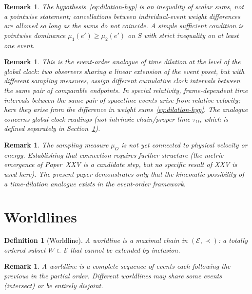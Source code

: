 \documentclass[12pt]{article}
\newtheorem{definition}[theorem]{Definition}
\newtheorem{remark}[theorem]{Remark}
\newcommand{\Ecal}{\mathcal{E}}
\begin{document}
\begin{remark}
The hypothesis~\eqref{eq:dilation-hyp} is an inequality of scalar sums, not a pointwise statement; cancellations between individual-event weight differences are allowed so long as the sums do not coincide. A simple sufficient condition is pointwise dominance $\mu_1(e') \geq \mu_2(e')$ on $S$ with strict inequality on at least one event.
\end{remark}

\begin{remark}
This is the event-order analogue of time dilation at the level of the global clock: two observers sharing a linear extension of the event poset, but with different sampling measures, assign different cumulative clock intervals between the same pair of comparable endpoints. In special relativity, frame-dependent time intervals between the same pair of spacetime events arise from relative velocity; here they arise from the difference in weight sums~\eqref{eq:dilation-hyp}. The analogue concerns global clock readings (not intrinsic chain/proper time $\tau_O$, which is defined separately in Section~\ref{sec:worldlines}).
\end{remark}

\begin{remark}
The sampling measure $\mu_O$ is not yet connected to physical velocity or energy. Establishing that connection requires further structure (the metric emergence of Paper~XXV is a candidate step, but no specific result of XXV is used here). The present paper demonstrates only that the \textit{kinematic possibility} of a time-dilation analogue exists in the event-order framework.
\end{remark}

\section{Worldlines}\label{sec:worldlines}

\begin{definition}[Worldline]\label{def:worldline}
A \textit{worldline} is a maximal chain in $(\Ecal, \prec)$: a totally ordered subset $W \subset \Ecal$ that cannot be extended by inclusion.
\end{definition}

\begin{remark}
A worldline is a complete sequence of events each following the previous in the partial order. Different worldlines may share some events (intersect) or be entirely disjoint.
\end{remark}
\end{document}
